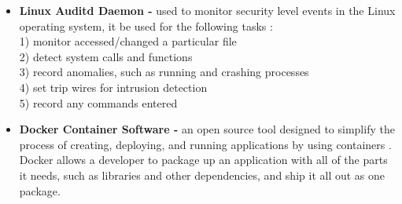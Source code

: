 \documentclass[grad,lot,lof,11pt,oneside,onehalfspace]{RUthesis}
\begin{document}
\begin{itemize}
	\item \textbf{Linux Auditd Daemon -} used to monitor security level events in the Linux operating system, it be used for the following tasks \cite{steve_grubb_audit-userspace:_2018}:\\
	1) monitor accessed/changed a particular file\\
	2) detect system calls and functions\\
	3) record anomalies, such as running and crashing processes\\
	4) set trip wires for intrusion detection\\
	5) record any commands entered\\ 	
	\item \textbf{Docker Container Software - } an open source tool designed to simplify the process of creating, deploying, and running applications by using containers \cite{noauthor_what_2015}. Docker allows a developer to package up an application with all of the parts it needs, such as libraries and other dependencies, and ship it all out as one package.
\end{itemize}
\end{document}

